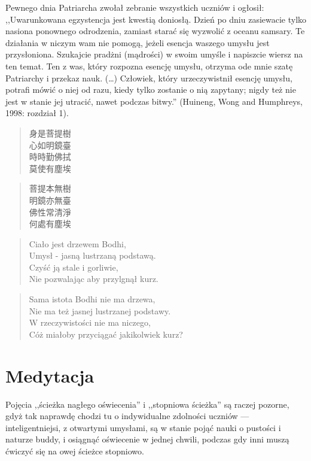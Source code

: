 Pewnego dnia Patriarcha zwołał zebranie wszystkich uczniów i ogłosił: ,,Uwarunkowana egzystencja jest kwestią doniosłą. Dzień po dniu zasiewacie tylko nasiona ponownego odrodzenia, zamiast starać się wyzwolić z oceanu samsary. Te działania w niczym wam nie pomogą, jeżeli esencja waszego umysłu jest przysłoniona. Szukajcie pradżni (mądrości) w swoim umyśle i napiszcie wiersz na ten temat. Ten z was, który rozpozna esencję umysłu, otrzyma ode mnie szatę Patriarchy i przekaz nauk. (\ldots) Człowiek, który urzeczywistnił esencję umysłu, potrafi mówić o niej od razu, kiedy tylko zostanie o nią zapytany; nigdy też nie jest w stanie jej utracić, nawet podczas bitwy.'' (Huineng, Wong and Humphreys, 1998: rozdział 1).

\begin{minipage}[t]{0.4\textwidth}
\begin{verse}
身是菩提樹\\
心如明鏡臺\\
時時勤佛拭\\
莫使有塵埃
\end{verse}
\begin{verse}
菩提本無樹\\
明鏡亦無臺\\
佛性常清淨\\
何處有塵埃
\end{verse}
\end{minipage}
\begin{minipage}[t]{0.6\textwidth}
\itshape
\begin{verse}
Ciało jest drzewem Bodhi,\\
Umysł - jasną lustrzaną podstawą.\\
Czyść ją stale i gorliwie,\\
Nie pozwalając aby przylgnął kurz. 
\end{verse}
\begin{verse}
Sama istota Bodhi nie ma drzewa,\\
Nie ma też jasnej lustrzanej podstawy.\\
W rzeczywistości nie ma niczego,\\
Cóż miałoby przyciągać jakikolwiek kurz?
\end{verse}
\end{minipage}

\section{Medytacja}

Pojęcia ,,ścieżka nagłego oświecenia'' i ,,stopniowa ścieżka'' są raczej pozorne, gdyż tak naprawdę chodzi tu o indywidualne zdolności uczniów --- inteligentniejsi, z otwartymi umysłami, są w stanie pojąć nauki o pustości i naturze buddy, i osiągnąć oświecenie w jednej chwili, podczas gdy inni muszą ćwiczyć się na owej ścieżce stopniowo.

